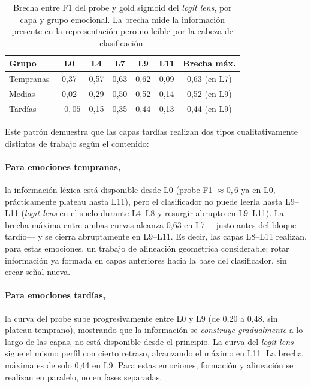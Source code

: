 \begin{table}[ht]
\centering
\caption{Brecha entre F1 del probe y gold sigmoid del \emph{logit lens}, por
capa y grupo emocional. La brecha mide la información presente en la
representación pero no leíble por la cabeza de clasificación.}
\label{tab:logit-lens-brechas}
\begin{tabular}{lcccccc}
\toprule
\textbf{Grupo} & \textbf{L0} & \textbf{L4} & \textbf{L7} & \textbf{L9} & \textbf{L11}
& \textbf{Brecha máx.} \\
\midrule
Tempranas & 0{,}37 & 0{,}57 & 0{,}63 & 0{,}62 & 0{,}09 & 0{,}63 (en L7) \\
Medias    & 0{,}02 & 0{,}29 & 0{,}50 & 0{,}52 & 0{,}14 & 0{,}52 (en L9) \\
Tardías   & $-0{,}05$ & 0{,}15 & 0{,}35 & 0{,}44 & 0{,}13 & 0{,}44 (en L9) \\
\bottomrule
\end{tabular}
\end{table}

Este patrón demuestra que las capas tardías realizan dos tipos
cualitativamente distintos de trabajo según el contenido:

\paragraph{Para emociones tempranas,}
la información léxica está disponible desde L0 (probe F1 $\approx 0{,}6$
ya en L0, prácticamente plateau hasta L11), pero el clasificador no
puede leerla hasta L9--L11 (\emph{logit lens} en el suelo durante L4--L8 y
resurgir abrupto en L9--L11). La brecha máxima entre ambas curvas
alcanza 0{,}63 en L7 ---justo antes del bloque tardío--- y se cierra
abruptamente en L9--L11. Es decir, las capas L8--L11 realizan, para
estas emociones, un trabajo de alineación geométrica considerable:
rotar información ya formada en capas anteriores hacia la base del
clasificador, sin crear señal nueva.

\paragraph{Para emociones tardías,}
la curva del probe sube progresivamente entre L0 y L9 (de 0{,}20 a
0{,}48, sin plateau temprano), mostrando que la información se
\emph{construye gradualmente} a lo largo de las capas, no está
disponible desde el principio. La curva del \emph{logit lens} sigue el mismo
perfil con cierto retraso, alcanzando el máximo en L11. La brecha
máxima es de solo 0{,}44 en L9. Para estas emociones, formación
y alineación se realizan en paralelo, no en fases separadas.

